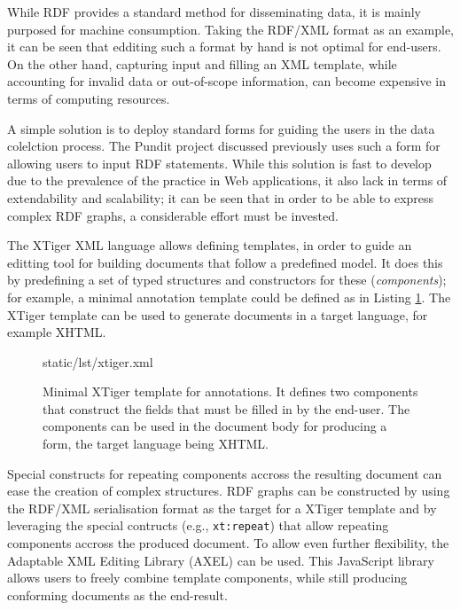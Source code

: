 While RDF provides a standard method for disseminating data, it is mainly
purposed for machine consumption. Taking the RDF/XML format as an example, it
can be seen that edditing such a format by hand is not optimal for end-users.
On the other hand, capturing input and filling an XML template, while
accounting for invalid data or out-of-scope information, can become expensive
in terms of computing resources.

A simple solution is to deploy standard forms for guiding the users in the data
colelction process. The Pundit project discussed previously uses such a form for
allowing users to input RDF statements. While this solution is fast to develop
due to the prevalence of the practice in Web applications, it also lack in terms
of extendability and scalability; it can be seen that in order to be able to
express complex RDF graphs, a considerable effort must be invested.

The XTiger \cite{ref:xtiger} XML language allows defining templates, in order
to guide an editting tool for building documents that follow a predefined
model. It does this by predefining a set of typed structures and constructors
for these (\textit{components}); for example, a minimal annotation template
could be defined as in Listing \ref{lst:xtiger}. The XTiger template can be
used to generate documents in a target language, for example XHTML.

\begin{figure}[!ht]
  
    {static/lst/xtiger.xml}
    \caption[XTiger template fragment for annotations]
            {Minimal XTiger template for annotations. It defines two components
             that construct the fields that must be filled in by the end-user.
             The components can be used in the document body for producing
             a form, the target language being XHTML.}
    \label{lst:xtiger}
\end{figure}

Special constructs for repeating components accross the resulting document can
ease the creation of complex structures. RDF graphs can be constructed by using
the RDF/XML serialisation format as the target for a XTiger template and by
leveraging the special contructs (e.g., \texttt{xt:repeat}) that allow
repeating components accross the produced document. To allow even further
flexibility, the Adaptable XML Editing Library (AXEL) \cite{ref:axel} can be
used. This JavaScript library allows users to freely combine template
components, while still producing conforming documents as the end-result.
